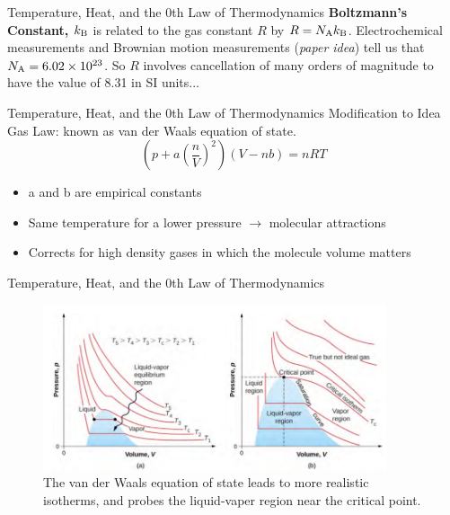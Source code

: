 \documentclass{beamer}
\begin{document}
\begin{frame}{Temperature, Heat, and the 0th Law of Thermodynamics}
\textbf{\alert{Boltzmann's Constant, $k_{\rm B}$}} is related to the gas constant $R$ by $R = N_{\rm A} k_{\rm B}$.  Electrochemical measurements and Brownian motion measurements (\textit{paper idea}) tell us that $N_{\rm A} = 6.02 \times 10^{23}$.  So $R$ involves cancellation of many orders of magnitude to have the value of 8.31 in SI units...
\end{frame}

\begin{frame}{Temperature, Heat, and the 0th Law of Thermodynamics}
Modification to Idea Gas Law: known as van der Waals equation of state.
\begin{equation}
\left(p + a \left(\frac{n}{V}\right)^2\right)(V-nb) = nRT
\end{equation}
\begin{itemize}
\item a and b are empirical constants
\item Same temperature for a lower pressure $\rightarrow$ molecular attractions
\item Corrects for high density gases in which the molecule volume matters
\end{itemize}
\end{frame}

\begin{frame}{Temperature, Heat, and the 0th Law of Thermodynamics}
\small
\begin{figure}
\centering
\includegraphics[width=0.9\textwidth]{figures/p3.png}
\caption{\label{fig:p3} The van der Waals equation of state leads to more realistic isotherms, and probes the liquid-vaper region near the critical point.}
\end{figure}
\end{frame}
\end{document}
